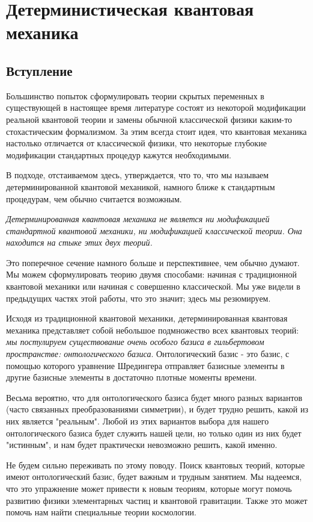 \documentclass[main.tex]{subfiles}
\begin{document}
\section{Детерминистическая квантовая механика}\label{ch4}

\subsection{Вступление}\label{ch4.1}

Большинство попыток сформулировать теории скрытых переменных в существующей в настоящее время литературе состоят из некоторой модификации реальной квантовой теории и замены обычной классической физики каким-то стохастическим формализмом. За этим всегда стоит идея, что квантовая механика настолько отличается от классической физики, что некоторые глубокие модификации стандартных процедур кажутся необходимыми.

В подходе, отстаиваемом здесь, утверждается, что то, что мы называем детерминированной квантовой механикой, намного ближе к стандартным процедурам, чем обычно считается возможным.

\textit{Детерминированная квантовая механика не является ни модификацией стандартной квантовой механики, ни модификацией классической теории. Она находится на стыке этих двух теорий.}

Это поперечное сечение намного больше и перспективнее, чем обычно думают. Мы можем сформулировать теорию двумя способами: начиная с традиционной квантовой механики или начиная с совершенно классической. Мы уже видели в предыдущих частях этой работы, что это значит; здесь мы резюмируем.

Исходя из традиционной квантовой механики, детерминированная квантовая механика представляет собой небольшое подмножество всех квантовых теорий: \textit{мы постулируем существование очень особого базиса в гильбертовом пространстве: онтологического базиса}. Онтологический базис - это базис, с помощью которого уравнение Шредингера отправляет базисные элементы в другие базисные элементы в достаточно плотные моменты времени.

Весьма вероятно, что для онтологического базиса будет много разных вариантов (часто связанных преобразованиями симметрии), и будет трудно решить, какой из них является "реальным". Любой из этих вариантов выбора для нашего онтологического базиса будет служить нашей цели, но только один из них будет "истинным", и нам будет практически невозможно решить, какой именно.

Не будем сильно переживать по этому поводу. Поиск квантовых теорий, которые имеют онтологический базис, будет важным и трудным занятием. Мы надеемся, что это упражнение может привести к новым теориям, которые могут помочь развитию физики элементарных частиц и квантовой гравитации. Также это может помочь нам найти специальные теории космологии.
\end{document}
